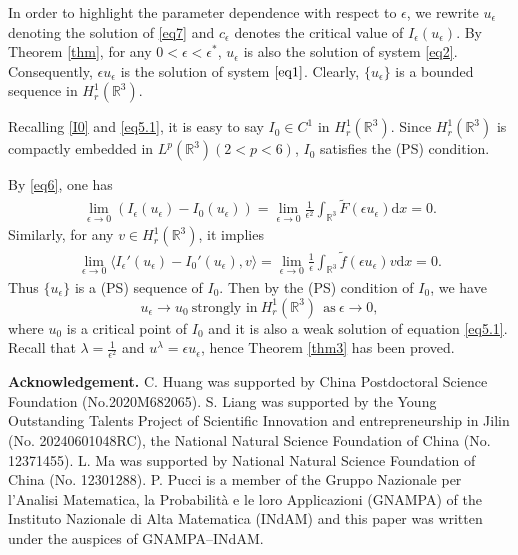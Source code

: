 \documentclass[12pt]{amsart}
\numberwithin{equation}{section}
\theoremstyle{definition}
\begin{document}
 In order to highlight the parameter dependence with respect to $\epsilon$, we rewrite $u_\epsilon$ denoting the
 solution of \eqref{eq7} and $c_\epsilon$ denotes the critical value of $I_{\epsilon}(u_\epsilon)$. By Theorem \ref{thm}, for any $0<\epsilon<\epsilon^{*}$, $u_{\epsilon}$ is also the solution of system \eqref{eq2}. Consequently, $\epsilon u_{\epsilon}$ is the solution of system $\eqref{eq1}$.
Clearly, $\{u_{\epsilon}\}$ is a bounded sequence in $H^{1}_{r}(\mathbb{R}^3)$.

Recalling \eqref{I0} and \eqref{eq5.1},
it is easy to say $I_0\in C^{1}$ in $H^{1}_{r}(\mathbb{R}^3)$.  Since $H^1_r(\mathbb R^3)$ is compactly embedded in $L^p(\mathbb{R}^3)(2<p<6)$, $I_0$ satisfies the (PS) condition.

By \eqref{eq6}, one has
\begin{equation*}
		\begin{split}
		\lim\limits_{\epsilon\to0}\left(I_{\epsilon}(u_{\epsilon})-I_{0}(u_{\epsilon})\right)=	\lim\limits_{\epsilon\to0}\frac{1}{\epsilon^2}\int_{\mathbb R^3}\tilde F(\epsilon u_{\epsilon})\text{d}x=0.
	\end{split}\end{equation*}
Similarly, for any $v\in H^{1}_{r}(\mathbb{R}^3)$, it implies
\begin{equation*}
		\begin{split}
		\lim\limits_{\epsilon\to0}\langle I_{\epsilon}'(u_{\epsilon})-I_{0}'(u_\epsilon),v\rangle=	\lim\limits_{\epsilon\to0}\frac{1}{\epsilon}\int_{\mathbb R^3}\tilde f(\epsilon u_{\epsilon})v\text{d}x=0.
	\end{split}\end{equation*}
Thus $\{u_\epsilon\}$ is a (PS) sequence of $I_0$. Then by the (PS) condition of $I_0$, we have
$$u_{\epsilon}\to u_0~\text{strongly~in}~H^{1}_{r}(\mathbb{R}^3)\ ~\text{as}~\epsilon\to0,$$
where $u_0$ is a critical point of $I_0$ and it is also a weak solution of equation \eqref{eq5.1}. Recall that $\lambda=\frac{1}{\epsilon^2}$ and $u^{\lambda}=\epsilon u_{\epsilon}$, hence Theorem \ref{thm3} has been proved.

	\medskip
	\textbf{Acknowledgement.}
	C. Huang was supported by China Postdoctoral Science Foundation (No.2020M682065). S. Liang was supported by  the Young Outstanding Talents Project of Scientific Innovation and entrepreneurship in Jilin (No. 20240601048RC), the National Natural Science
Foundation of China (No. 12371455). L. Ma was supported by National Natural Science Foundation of China (No. 12301288). P. Pucci is a member of the  Gruppo Nazionale per
l'Analisi Ma\-te\-ma\-ti\-ca, la Probabilit\`a e le loro Applicazioni (GNAMPA) of the  Instituto Nazionale di Alta Matematica (INdAM)
and this paper was written under the auspices of GNAMPA--INdAM.

	\nocite{*}
	
	
\end{document}
